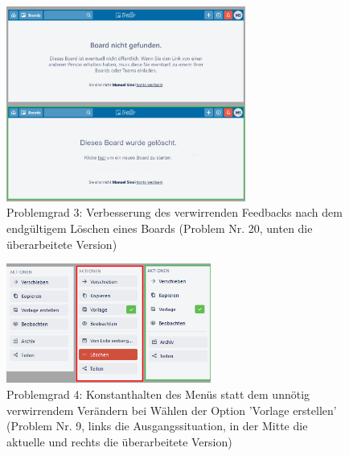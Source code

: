 \begin{figure}[h]
    \includegraphics[width=0.7\textwidth]{images/Verbesserungsvorschlaege/3 BoardNichtGefunden.PNG}
    \centering
    \caption{Problemgrad 3: Verbesserung des verwirrenden Feedbacks nach dem endgültigem Löschen eines Boards (Problem Nr. 20, unten die überarbeitete Version)}
    \label{fig:feedback}
\end{figure}

\begin{figure}[h]   
    \includegraphics[width=0.6\textwidth]{images/Verbesserungsvorschlaege/4 VorlageErstellen.png}
    \centering
    \caption{Problemgrad 4: Konstanthalten des Menüs statt dem unnötig verwirrendem Verändern bei Wählen der Option 'Vorlage erstellen' (Problem Nr. 9, links die Ausgangssituation, in der Mitte die aktuelle und rechts die überarbeitete Version)}
    \label{fig:vorlage}
\end{figure}
\FloatBarrier





